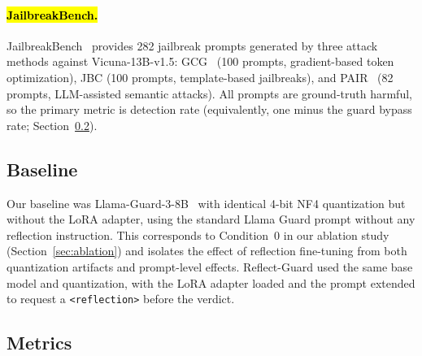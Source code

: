 \documentclass[superintelligence,article,accept,moreauthors]{Definitions/mdpi}
\begin{document}
\paragraph{\hl{JailbreakBench.}} JailbreakBench~\citep{chao2024jailbreakbench} provides 282 jailbreak prompts generated by three attack methods against Vicuna-13B-v1.5: GCG~\citep{zou2023universal} (100 prompts, gradient-based token optimization), JBC (100 prompts, template-based jailbreaks), and PAIR~\citep{chao2023jailbreaking} (82 prompts, LLM-assisted semantic attacks). All prompts are ground-truth harmful, so the primary metric is detection rate (equivalently, one minus the guard bypass rate; Section~\ref{sec:metrics}).

\subsection{Baseline}

Our baseline was Llama-Guard-3-8B~\citep{metallamaguard3} with identical 4-bit NF4 quantization but without the LoRA adapter, using the standard Llama Guard prompt without any reflection instruction. This corresponds to Condition~0 in our ablation study (Section~\ref{sec:ablation}) and isolates the effect of reflection fine-tuning from both quantization artifacts and prompt-level effects. Reflect-Guard used the same base model and quantization, with the LoRA adapter loaded and the prompt extended to request a \texttt{<reflection>} before the verdict.

\subsection{Metrics}
\label{sec:metrics}
\end{document}
